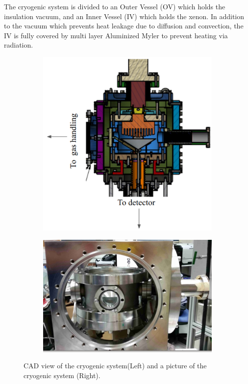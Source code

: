 The cryogenic system is divided to an Outer Vessel (OV) which holds 
the insulation vacuum, and an Inner Vessel (IV) which holds the xenon. In addition to the vacuum which prevents heat leakage due to diffusion and convection, the IV is fully covered by multi layer Aluminized Myler to prevent heating via radiation.  

\begin{figure}[h]
\centering
\begin{subfigure}[c]{0.35\textheight}
\includegraphics[width=\textwidth]{cryoMirror.png}
\end{subfigure}
\begin{subfigure}[c]{0.25\textheight}
\includegraphics[width=\textwidth]{cryoOpenCrop.png}
\end{subfigure}
\caption{ CAD view of the cryogenic system(Left) and a picture of the cryogenic system (Right). 
\label{fig:cryo}}
\end{figure}




